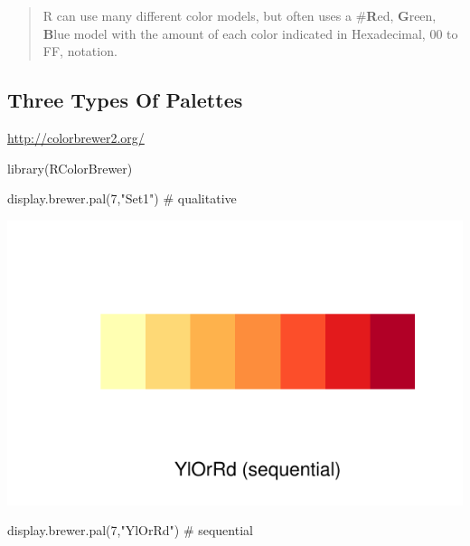 \documentclass[]{article}
\newenvironment{Shaded}{}{}
\newcommand{\CommentTok}[1]{\textcolor[rgb]{0.00,0.50,0.00}{#1}}
\newcommand{\DecValTok}[1]{#1}
\newcommand{\KeywordTok}[1]{\textcolor[rgb]{0.00,0.00,1.00}{#1}}
\newcommand{\NormalTok}[1]{#1}
\newcommand{\StringTok}[1]{\textcolor[rgb]{0.00,0.50,0.50}{#1}}
\begin{document}
\begin{quote}
R can use many different color models, but often uses a \#\textbf{R}ed,
\textbf{G}reen, \textbf{B}lue model with the amount of each color
indicated in Hexadecimal, 00 to FF, notation.
\end{quote}

\hypertarget{three-types-of-palettes}{%
\subsection{Three Types Of Palettes}\label{three-types-of-palettes}}

\url{http://colorbrewer2.org/}

\begin{Shaded}
\begin{Highlighting}[]
\KeywordTok{library}\NormalTok{(RColorBrewer)}
\end{Highlighting}
\end{Shaded}

\begin{Shaded}
\begin{Highlighting}[]
\KeywordTok{display.brewer.pal}\NormalTok{(}\DecValTok{7}\NormalTok{,}\StringTok{"Set1"}\NormalTok{) }\CommentTok{# qualitative}
\end{Highlighting}
\end{Shaded}

\includegraphics{design_files/figure-latex/unnamed-chunk-3-1.pdf}

\begin{Shaded}
\begin{Highlighting}[]
\KeywordTok{display.brewer.pal}\NormalTok{(}\DecValTok{7}\NormalTok{,}\StringTok{"YlOrRd"}\NormalTok{) }\CommentTok{# sequential}
\end{Highlighting}
\end{Shaded}
\end{document}
